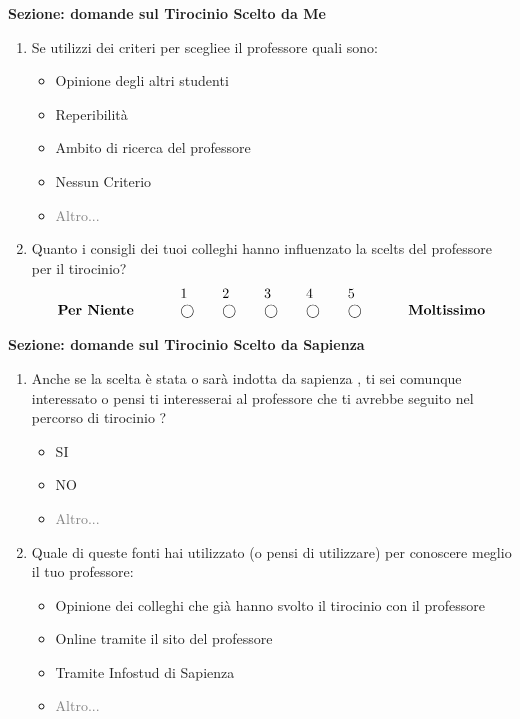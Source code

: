 \textbf{Sezione: domande sul Tirocinio Scelto da Me}
\begin{enumerate}
    \item Se utilizzi dei criteri per scegliee il professore quali sono:
    \begin{itemize}
        \item Opinione degli altri studenti
        \item Reperibilità
        \item Ambito di ricerca del professore
        \item Nessun Criterio
        \item \textcolor{gray}{Altro...}
    \end{itemize}
    \item Quanto i consigli dei tuoi colleghi hanno influenzato la scelts del professore per il tirocinio?
    \begin{equation*}
        \begin{array}{lllllll}
                        &  1 & 2 & 3 & 4 & 5 & \\
    \text { \textbf{Per Niente} } \quad \quad & \bigcirc \quad& \bigcirc \quad& \bigcirc \quad& \bigcirc \quad& \bigcirc \quad& \quad \text { \textbf{Moltissimo} }
        \end{array}
    \end{equation*}
\end{enumerate}



\textbf{Sezione: domande sul Tirocinio Scelto da Sapienza}
\begin{enumerate}
    \item Anche se la scelta è stata o sarà indotta da sapienza , ti sei comunque interessato o pensi ti interesserai al professore che ti avrebbe seguito nel percorso di tirocinio ?
    \begin{itemize}
        \item SI
        \item NO
        \item \textcolor{gray}{Altro...}
    \end{itemize}
    \item Quale di queste fonti hai utilizzato (o pensi di utilizzare) per conoscere meglio il tuo professore:
    \begin{itemize}
        \item Opinione dei colleghi che già hanno svolto il tirocinio con il professore
        \item Online tramite il sito del professore
        \item Tramite Infostud di Sapienza
        \item \textcolor{gray}{Altro...}
    \end{itemize}
\end{enumerate}

